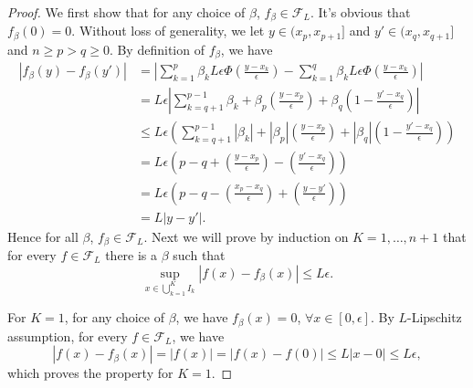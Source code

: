 \documentclass[11pt]{article}
\begin{document}
\begin{proof}
We first show that for any choice of $\beta$, $f_{\beta}\in\mathcal{F}_L$. It's obvious that $f_{\beta}(0)=0$. Without loss of generality, we let $y\in(x_p,x_{p+1}]$ and $y'\in(x_q,x_{q+1}]$ and $n\geq p>q\geq0$. By definition of $f_{\beta}$, we have
\begin{equation*}
    \begin{aligned}
        |f_{\beta}(y)-f_{\beta}(y')| 
        & = \left|\sum\limits_{k=1}^{p}\beta_kL\epsilon\Phi\left(\frac{y-x_k}{\epsilon}\right)-\sum\limits_{k=1}^{q}\beta_kL\epsilon\Phi\left(\frac{y-x_k}{\epsilon}\right)\right| \\
        & = L\epsilon\left|\sum\limits_{k=q+1}^{p-1}\beta_k+\beta_p\left(\frac{y-x_p}{\epsilon}\right)+\beta_q\left(1-\frac{y'-x_q}{\epsilon}\right)\right| \\
        & \leq L\epsilon\left(\sum\limits_{k=q+1}^{p-1}\left|\beta_k\right|+|\beta_p|\left(\frac{y-x_p}{\epsilon}\right)+|\beta_q|\left(1-\frac{y'-x_q}{\epsilon}\right)\right) \\
        & = L\epsilon\left(p-q+\left(\frac{y-x_p}{\epsilon}\right)-\left(\frac{y'-x_q}{\epsilon}\right)\right) \\
        & = L\epsilon\left(p-q-\left(\frac{x_p-x_q}{\epsilon}\right)+\left(\frac{y-y'}{\epsilon}\right)\right) \\
        & = L|y-y'|.
    \end{aligned}
\end{equation*}
Hence for all $\beta$, $f_{\beta}\in\mathcal{F}_L$.
Next we will prove by induction on $K=1,\dots,n+1$ that for every $f\in\mathcal{F}_L$ there is a $\beta$ such that 
\[
\sup\limits_{x\in\bigcup\limits_{k=1}^{K}I_k}|f(x)-f_{\beta}(x)| \leq L\epsilon.
\]

For $K=1$, for any choice of $\beta$, we have $f_{\beta}(x)=0$, $\forall x\in[0,\epsilon]$. By $L$-Lipschitz assumption, for every $f\in\mathcal{F}_L$, we have
\[
|f(x)-f_{\beta}(x)| = |f(x)| = |f(x)-f(0)| \leq L|x-0| \leq L\epsilon,
\]
which proves the property for $K=1$.


\end{proof}
\end{document}
